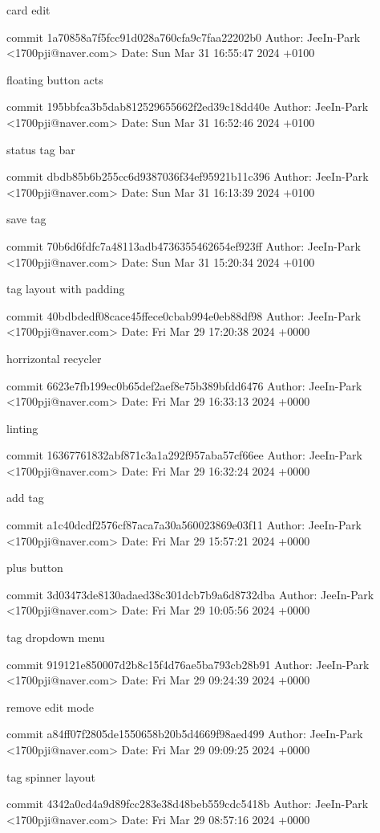     card edit

commit 1a70858a7f5fcc91d028a760cfa9c7faa22202b0
Author: JeeIn-Park <1700pji@naver.com>
Date:   Sun Mar 31 16:55:47 2024 +0100

    floating button acts

commit 195bbfca3b5dab812529655662f2ed39c18dd40e
Author: JeeIn-Park <1700pji@naver.com>
Date:   Sun Mar 31 16:52:46 2024 +0100

    status tag bar

commit dbdb85b6b255cc6d9387036f34ef95921b11c396
Author: JeeIn-Park <1700pji@naver.com>
Date:   Sun Mar 31 16:13:39 2024 +0100

    save tag

commit 70b6d6fdfc7a48113adb4736355462654ef923ff
Author: JeeIn-Park <1700pji@naver.com>
Date:   Sun Mar 31 15:20:34 2024 +0100

    tag layout with padding

commit 40bdbdedf08cace45ffece0cbab994e0eb88df98
Author: JeeIn-Park <1700pji@naver.com>
Date:   Fri Mar 29 17:20:38 2024 +0000

    horrizontal recycler

commit 6623e7fb199ec0b65def2aef8e75b389bfdd6476
Author: JeeIn-Park <1700pji@naver.com>
Date:   Fri Mar 29 16:33:13 2024 +0000

    linting

commit 16367761832abf871c3a1a292f957aba57cf66ee
Author: JeeIn-Park <1700pji@naver.com>
Date:   Fri Mar 29 16:32:24 2024 +0000

    add tag

commit a1c40dcdf2576cf87aca7a30a560023869e03f11
Author: JeeIn-Park <1700pji@naver.com>
Date:   Fri Mar 29 15:57:21 2024 +0000

    plus button

commit 3d03473de8130adaed38c301dcb7b9a6d8732dba
Author: JeeIn-Park <1700pji@naver.com>
Date:   Fri Mar 29 10:05:56 2024 +0000

    tag dropdown menu

commit 919121e850007d2b8c15f4d76ae5ba793cb28b91
Author: JeeIn-Park <1700pji@naver.com>
Date:   Fri Mar 29 09:24:39 2024 +0000

    remove edit mode

commit a84ff07f2805de1550658b20b5d4669f98aed499
Author: JeeIn-Park <1700pji@naver.com>
Date:   Fri Mar 29 09:09:25 2024 +0000

    tag spinner layout

commit 4342a0cd4a9d89fcc283e38d48beb559cdc5418b
Author: JeeIn-Park <1700pji@naver.com>
Date:   Fri Mar 29 08:57:16 2024 +0000

